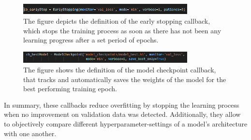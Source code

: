 \begin{figure}[H]
  \begin{center}
  \includegraphics[angle=0, width=0.8\textwidth]{Figures/EarlyStopping.PNG}
  \caption[EarlyStoping callback]{The figure depicts the definition of the early stopping callback, which stops the training process as soon as there has not been any learning progress after a set period of epochs.}
  \label{fig:EarlyStopping}
  \end{center}
\end{figure}

\begin{figure}[H]
  \begin{center}
  \includegraphics[angle=0, width=0.8\textwidth]{Figures/ModelCheckpoint.PNG}
  \caption[Model checkpoint callback]{The figure shows the definition of the model checkpoint callback, that tracks and automatically saves the weights of the model for the best performing training epoch.}
  \label{fig:ModelCheckpoint}
  \end{center}
\end{figure}

\noindent In summary, these callbacks reduce overfitting by stopping the learning process when no improvement on validation data was detected. Additionally, they allow to objectively compare different hyperparameter-settings of a model's architecture with one another.
